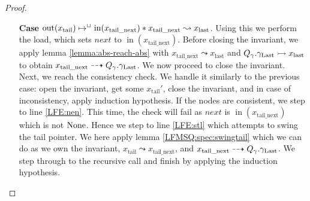 \documentclass[a4paper, 10pt]{report}
\theoremstyle{definition}
\newcommand{\nIn}[1]{\operatorname{in}(#1)}
\newcommand{\nOut}[1]{\operatorname{out}(#1)}
\newcommand{\node}{x}
\newcommand{\nodeN}[1]{\node_{\mathrm{#1}}}
\newcommand{\nodetail}{\nodeN{tail}}
\newcommand{\nodelast}{\nodeN{last}}
\newcommand{\nodetailnext}{\nodeN{tail\_next}}
\newcommand{\Qg}{Q_\gname}
\newcommand{\glast}{\gname_{\mathrm{Last}}}
\newcommand{\reach}[2]{#1 \leadsto #2}
\newcommand{\ar}[2]{#1 \dashrightarrow #2}
\newcommand{\ap}[2]{#1 \rightarrowtail #2}
\begin{document}
\begin{proof}
\begin{itemize}
    \item[\textbf{Case}]
    $\nOut{\nodetail} \mapsto^{\persistently} \nIn{\nodetailnext} \star \reach{\nodetailnext}{\nodelast}$. Using this we perform the load, which sets $next$ to $\nIn{\nodetailnext}$. Before closing the invariant, we apply lemma \ref{lemma:abs-reach-abs} with $\reach{\nodetailnext}{\nodelast}$ and $\ap{\Qg.\glast}{\nodelast}$ to obtain $\ar{\nodetailnext}{\Qg.\glast}$. We now proceed to close the invariant. Next, we reach the consistency check. We handle it similarly to the previous case: open the invariant, get some $\nodetail'$, close the invariant, and in case of inconsistency, apply induction hypothesis. If the nodes are consistent, we step to line \ref{LFE:nen}. This time, the check will fail as $next$ is $\nIn{\nodetailnext}$ which is not $\operatorname{None}$. Hence we step to line \ref{LFE:stl} which attempts to swing the tail pointer. We here apply lemma \ref{LFMSQ:spec:swingtail} which we can do as we own the invariant, $\reach{\nodetail}{\nodetailnext}$, and $\ar{\nodetailnext}{\Qg.\glast}$. We step through to the recursive call and finish by applying the induction hypothesis.
  \end{itemize}
\end{proof}
\end{document}
